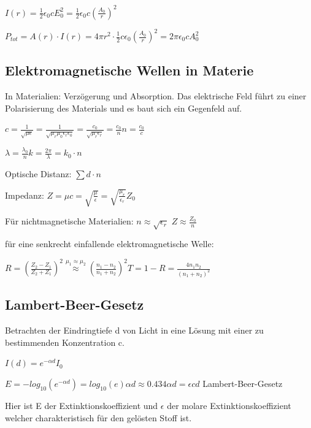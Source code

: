 \documentclass[10pt,a4paper]{scrartcl}
\begin{document}
\begin{multicols*}{3}
	$I(r)=\frac{1}{2}\epsilon_0 c E_0^2=\frac{1}{2}\epsilon_0 c \left(\frac{A_0}{r}\right)^2$
	
	$P_{tot}=A(r)\cdot I(r)=4\pi r^2 \cdot\frac{1}{2}c\epsilon_0\left(\frac{A_0}{r}\right)^2=2\pi\epsilon_0 c A_0^2$
	
	 
	
	\subsection{Elektromagnetische Wellen in Materie}
	
	In Materialien: Verzögerung und Absorption. Das elektrische Feld führt zu einer Polarisierung des Materials und es baut sich ein Gegenfeld auf.
	
	$c=\frac{1}{\sqrt{\mu\epsilon}}=\frac{1}{\sqrt{\mu_r\mu_0\epsilon_r\epsilon_0}}=\frac{c_0}{\sqrt{\mu_r\epsilon_r}}=\frac{c_0}{n}$\hfill$n=\frac{c_0}{c}$
	
	
	$\lambda=\frac{\lambda_0}{n}$\hfill$k=\frac{2\pi}{\lambda}=k_0\cdot n$
	
	Optische Distanz: $\sum{d\cdot n}$	
	
	\finn
	
	Impedanz: $Z=\mu c=\sqrt{\frac{\mu}{\epsilon}}=\sqrt{\frac{\mu_r}{\epsilon_r}}Z_0$
	
	Für nichtmagnetische Materialien: $n\approx\sqrt{\epsilon_r}$ \hfill $Z\approx\frac{Z_0}{n}$
	
	für eine senkrecht einfallende elektromagnetische Welle:
	
	$R=(\frac{Z_2-Z_1}{Z_2+Z_1})^2\overset{\mu_1\approx\mu_2}{\approx}(\frac{n_1-n_2}{n_1+n_2})^2$\hfill$T=1-R=\frac{4n_1n_2}{(n_1+n_2)^2}$
	
	\subsection{Lambert-Beer-Gesetz}
		
	Betrachten der Eindringtiefe d von Licht in eine Lösung mit einer zu bestimmenden Konzentration c.
	
	$I(d)=e^{-\alpha d}I_0$
	
	$E=-log_10(e^{-\alpha d})=log_10(e)\alpha d\approx 0.434\alpha d=\epsilon c d$ Lambert-Beer-Gesetz
	
	Hier ist E der Extinktionskoeffizient und $\epsilon$ der molare Extinktionskoeffizient welcher charakteristisch für den gelösten Stoff ist.
	

\end{multicols*}
\end{document}
